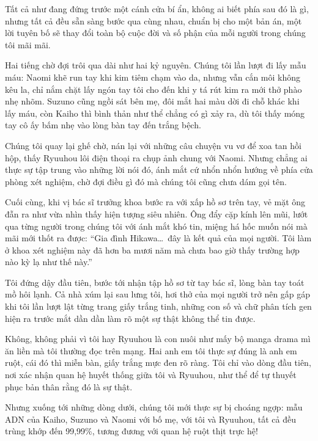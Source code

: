 ﻿\documentclass[../main.tex]{subfiles}
\begin{document}
Tất cả như đang đứng trước một cánh cửa bí ẩn, không ai biết phía sau đó là gì, nhưng tất cả đều sẵn sàng bước qua cùng nhau, chuẩn bị cho một bản án, một lời tuyên bố sẽ thay đổi toàn bộ cuộc đời và số phận của mỗi người trong chúng tôi mãi mãi.

\ct

Hai tiếng chờ đợi trôi qua dài như hai kỷ nguyên. Chúng tôi lần lượt đi lấy mẫu máu: Naomi khẽ run tay khi kim tiêm chạm vào da, nhưng vẫn cắn môi không kêu la, chỉ nắm chặt lấy ngón tay tôi cho đến khi y tá rút kim ra mới thở phào nhẹ nhõm. Suzuno cũng ngồi sát bên mẹ, đôi mắt hai màu dời đi chỗ khác khi lấy máu, còn Kaiho thì bình thản như thể chẳng có gì xảy ra, dù tôi thấy móng tay cô ấy bấm nhẹ vào lòng bàn tay đến trắng bệch.

Chúng tôi quay lại ghế chờ, nán lại với những câu chuyện vu vơ để xoa tan hồi hộp, thấy Ryuuhou lôi điện thoại ra chụp ảnh chung với Naomi. Nhưng chẳng ai thực sự tập trung vào những lời nói đó, ánh mắt cứ nhổn nhổn hướng về phía cửa phòng xét nghiệm, chờ đợi điều gì đó mà chúng tôi cũng chưa dám gọi tên.

Cuối cùng, khi vị bác sĩ trưởng khoa bước ra với xấp hồ sơ trên tay, vẻ mặt ông đẫn ra như vừa nhìn thấy hiện tượng siêu nhiên. Ông đẩy cặp kính lên mũi, lướt qua từng người trong chúng tôi với ánh mắt khó tin, miệng há hốc muốn nói mà mãi mới thốt ra được: ``Gia đình Hikawa\dots\ đây là kết quả của mọi người. Tôi làm ở khoa xét nghiệm này đã hơn ba mươi năm mà chưa bao giờ thấy trường hợp nào kỳ lạ như thế này.''

Tôi đứng dậy đầu tiên, bước tới nhận tập hồ sơ từ tay bác sĩ, lòng bàn tay toát mồ hôi lạnh. Cả nhà xúm lại sau lưng tôi, hơi thở của mọi người trở nên gấp gáp khi tôi lần lượt lật từng trang giấy trắng tinh, những con số và chữ phân tích gen hiện ra trước mắt dần dần làm rõ một sự thật không thể tin được.

Không, không phải vì tôi hay Ryuuhou là con nuôi như mấy bộ manga drama mì ăn liền mà tôi thường đọc trên mạng. Hai anh em tôi thực sự đúng là anh em ruột, cái đó thì miễn bàn, giấy trắng mực đen rõ ràng. Tôi chỉ vào dòng đầu tiên, nơi xác nhận quan hệ huyết thống giữa tôi và Ryuuhou, như thể để tự thuyết phục bản thân rằng đó là sự thật.

Nhưng xuống tới những dòng dưới, chúng tôi mới thực sự bị choáng ngợp: mẫu ADN của Kaiho, Suzuno và Naomi với bố mẹ, với tôi và Ryuuhou, tất cả đều trùng khớp đến 99,99\%, tương đương với quan hệ ruột thịt trực hệ!
\end{document}
